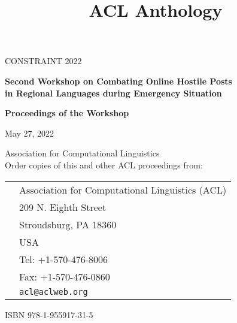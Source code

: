 \documentclass[11pt,oneside]{book}
\date{}
\title{ACL Anthology}
\begin{document}
\begin{titlepage}
  \begin{center}
    \vspace{1.5cm}

    {\LARGE CONSTRAINT 2022}

    \vspace*{65mm}

    {\bf\LARGE Second Workshop on Combating Online Hostile Posts \\in Regional Languages during Emergency Situation}

    \vspace*{5cm}

    {\bf\LARGE Proceedings of the Workshop}

    \vfill

    {\LARGE May 27, 2022}
  \end{center}
\end{titlepage}
\newpage



\vspace*{11cm}
{\large

\noindent
{} Association for Computational Linguistics\\

\vspace*{2cm}
\noindent
Order copies of this and other ACL proceedings from:

\vspace*{1cm}
\begin{tabular}{p{1.5cm}l}
& Association for Computational Linguistics (ACL)\\
& 209 N. Eighth Street\\
& Stroudsburg, PA 18360\\
& USA\\
& Tel: +1-570-476-8006\\
& Fax: +1-570-476-0860\\
&{\tt acl@aclweb.org}\\
\end{tabular}

\vspace*{1cm}
ISBN 978-1-955917-31-5
}
\newpage
\end{document}
